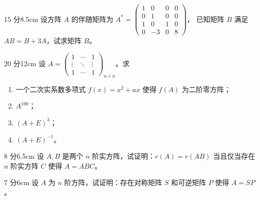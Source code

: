 \begin{problem}{15 分}{8.5cm}
设方阵 $A$ 的伴随矩阵为
$A^{*}=\begin{pmatrix}1&0&0&0\\0&1&0&0\\1&0&1&0\\0&-3&0&8\end{pmatrix}$，
已知矩阵 $B$ 满足 $AB=B+3A$，试求矩阵 $B$。
\end{problem}

\begin{problem}{20 分}{12cm}
设 $A=\begin{pmatrix}1&\cdots&1\\\vdots&\ddots&\vdots\\1&\cdots&1\end{pmatrix}_{n\times n}$。求
\begin{enumerate}[label=(\arabic*),leftmargin=2.2em,itemsep=0.25em,topsep=0.3em]
  \item 一个二次实系数多项式 $f(x)=x^{2}+ax$ 使得 $f(A)$ 为二阶零方阵；
  \item $A^{100}$；
  \item $(A+E)^{3}$；
  \item $(A+E)^{-1}$。
\end{enumerate}
\end{problem}

\begin{problem}{8 分}{6.5cm}
设 $A,B$ 是两个 $n$ 阶实方阵，试证明：$r(A)=r(AB)$ 当且仅当存在 $n$ 阶实方阵 $C$ 使得 $A=ABC$。
\end{problem}

\begin{problem}{7 分}{6cm}
设 $A$ 为 $n$ 阶方阵，试证明：存在对称矩阵 $S$ 和可逆矩阵 $P$ 使得 $A=SP$。
\end{problem}
